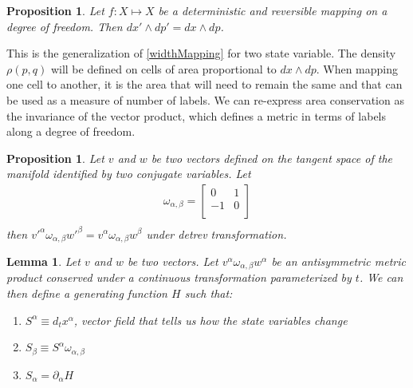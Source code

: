 \documentclass[twocolumn,floatfix,nofootinbib]{revtex4}   %
\theoremstyle{theorem}
\newtheorem{lem}[thm]{Lemma}
\newtheorem{prop}[thm]{Proposition}
\theoremstyle{definition}
\begin{document}
\begin{prop}\label{sdofMap}
Let $f: X \mapsto X$ be a deterministic and reversible mapping on a degree of freedom. Then $dx' \wedge dp' = dx \wedge dp$.
\end{prop}

This is the generalization of \ref{widthMapping} for two state variable. The density $\rho(p,q)$ will be defined on cells of area proportional to $dx \wedge dp$. When mapping one cell to another, it is the area that will need to remain the same and that can be used as a measure of number of labels. We can re-express area conservation as the invariance of the vector product, which defines a metric in terms of labels along a degree of freedom.

\begin{prop}\label{sdofInvariance}
Let $v$ and $w$ be two vectors defined on the tangent space of the manifold identified by two conjugate variables. Let
\begin{align*}
\omega_{\alpha, \beta} = \left[
  \begin{array}{cc}
    0 & 1 \\
    -1 & 0 \\
  \end{array}
\right] \\
\end{align*}
then $v'^{\alpha} \omega_{\alpha, \beta} w'^{\beta}=v^{\alpha} \omega_{\alpha, \beta} w^{\beta}$ under detrev transformation.
\end{prop}

\begin{lem}\label{genAntisim}
Let $v$ and $w$ be two vectors. Let $v^{\alpha} \omega_{\alpha, \beta} w^{\alpha}$ be an antisymmetric metric product conserved under a continuous transformation parameterized by $t$. We can then define a generating function $H$ such that:
\begin{enumerate}
\item $S^{\alpha} \equiv d_{t}x^{\alpha}$, vector field that tells us how the state variables change
\item $S_{\beta} \equiv S^{\alpha} \omega_{\alpha, \beta}$
\item $S_{\alpha} = \partial_{\alpha}H$
\end{enumerate}
\end{lem}
\end{document}
